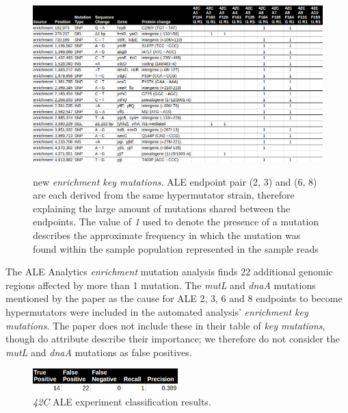 \documentclass[12pt,final,masters,chapterheads]{ucsd}  %
\begin{document}
\begin{figure}[H]
  \caption{new \textit{enrichment key mutations}. ALE endpoint pair (2, 3) and (6, 8) are each derived from the same hypermutator strain, therefore explaining the large amount of mutations shared between the endpoints. The value of \textit{1} used to denote the presence of a mutation describes the approximate frequency in which the mutation was found within the sample population represented in the sample reads \cite{breseq_paper}}
  \centering
  \includegraphics[width=\textwidth]{42c_new_enrich_muts.png}
  \label{fig:42c_new_enrich_muts}
\end{figure}

The ALE Analytics \textit{enrichment} mutation analysis finds 22 additional genomic regions affected by more than 1 mutation. The \textit{mutL} and \textit{dnaA} mutations mentioned by the paper as the cause for ALE 2, 3, 6 and 8 endpoints to become hypermutators were included in the automated analysis' \textit{enrichment key mutations}. The paper does not include these in their table of \textit{key mutations}, though do attribute describe their importance; we therefore do not consider the \textit{mutL} and \textit{dnaA} mutations as false positives.

\begin{figure}[H]
  \centering
   \caption{\textit{42C} ALE experiment classification results.}
  \includegraphics[width=0.5\textwidth]{42c_precision_recall.png}
\end{figure}
\end{document}
